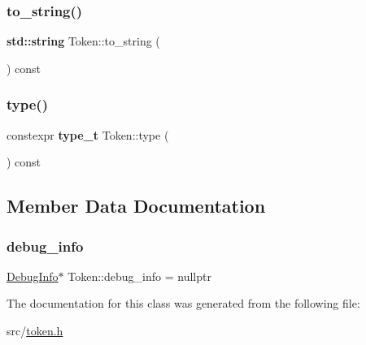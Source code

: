 \mbox{\label{class_token_a602aa1415de3415044205333495e72f5}} 
\subsubsection{\texorpdfstring{to\+\_\+string()}{to\_string()}}
{\footnotesize\ttfamily \textbf{ std\+::string} Token\+::to\+\_\+string (\begin{DoxyParamCaption}{ }\end{DoxyParamCaption}) const\hspace{0.3cm}{\ttfamily [inline]}}

\mbox{\label{class_token_ae2fdb5eb7109dfb00927d8f9545070c8}} 
\subsubsection{\texorpdfstring{type()}{type()}}
{\footnotesize\ttfamily constexpr \textbf{ type\+\_\+t} Token\+::type (\begin{DoxyParamCaption}{ }\end{DoxyParamCaption}) const\hspace{0.3cm}{\ttfamily [inline]}}



\subsection{Member Data Documentation}
\mbox{\label{class_token_addc71bf112cf6013bc9f9e05bcaa5b5e}} 
\subsubsection{\texorpdfstring{debug\+\_\+info}{debug\_info}}
{\footnotesize\ttfamily \hyperlink{struct_token_1_1_debug_info}{Debug\+Info}$\ast$ Token\+::debug\+\_\+info = nullptr}



The documentation for this class was generated from the following file\+:\begin{DoxyCompactItemize}
\item 
src/\hyperlink{token_8h}{token.\+h}\end{DoxyCompactItemize}
